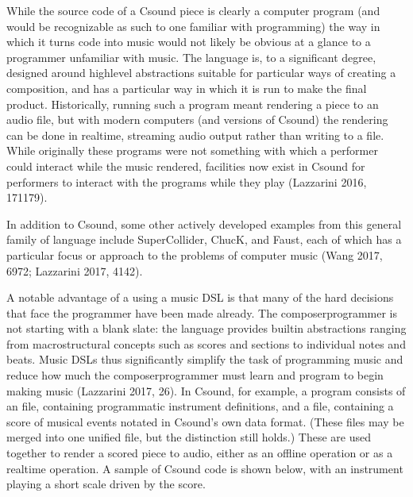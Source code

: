 \documentclass[letterpaper,10pt,english]{sphinxmanual}
\begin{document}
\sphinxAtStartPar
While the source code of a Csound piece is clearly a computer program
(and would be recognizable as such to one familiar with programming)
the way in which it turns code into music would not likely be obvious at a glance to a programmer unfamiliar with music.
The language is, to a significant degree, designed around high\sphinxhyphen{}level abstractions suitable for particular ways
of creating a composition, and has a particular way in which it is run to make the final product.
Historically, running such a program meant rendering a piece to an audio file, but
with modern computers (and versions of Csound) the rendering can be done in realtime,
streaming audio output rather than writing to a file.
While originally these programs were not something with which a performer could interact while the music rendered,
facilities now exist in Csound for performers to interact with the programs while they play (Lazzarini 2016, 171\sphinxhyphen{}179).

\sphinxAtStartPar
In addition to Csound, some other actively developed examples from this general family of language
include SuperCollider, ChucK, and Faust, each of which has a particular focus or approach to the problems
of computer music (Wang 2017, 69\sphinxhyphen{}72; Lazzarini 2017, 41\sphinxhyphen{}42).

\sphinxAtStartPar
A notable advantage of a using a music DSL is that many of the hard
decisions that face the programmer have been made already.
The composer\sphinxhyphen{}programmer is not starting with a blank slate:
the language provides built\sphinxhyphen{}in abstractions ranging from
macro\sphinxhyphen{}structural concepts such as scores and sections to individual notes and beats.
Music DSLs thus significantly simplify the task of programming music and reduce
how much the composer\sphinxhyphen{}programmer must learn and program to begin making music (Lazzarini 2017, 26).
In Csound, for example, a program consists of an  file, containing
programmatic instrument definitions, and a  file, containing a score
of musical events notated in Csound’s own data format. (These files
may be merged into one unified  file, but the distinction still holds.)
These are used together to render a scored piece to audio,
either as an offline operation or as a realtime operation.
A sample of Csound code is shown below, with an instrument playing a
short scale driven by the score.
\end{document}
